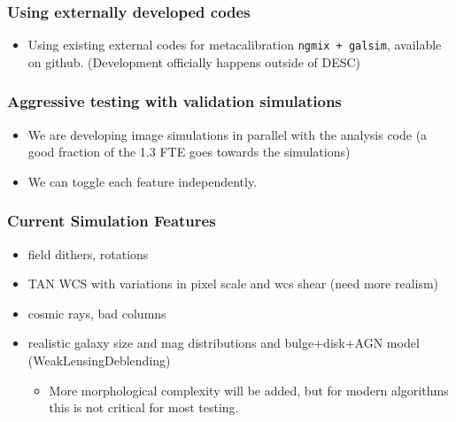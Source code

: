 \documentclass{beamer}
\begin{document}
\frame
{

    \frametitle{Using externally developed codes}

    \begin{itemize}

        \item Using existing external codes for metacalibration \texttt{ngmix + galsim}, available
            on github.  (Development
            officially happens outside of DESC)

    \end{itemize}

}

\frame
{

    \frametitle{Aggressive testing with validation simulations}

    \begin{itemize}

        \item We are developing image simulations in parallel with the analysis
            code (a good fraction of the 1.3 FTE goes towards the simulations)

        \item We can toggle each feature independently.

    \end{itemize}

}

\frame
{

    \frametitle{Current Simulation Features}


    \begin{itemize}

                \item field dithers, rotations

                \item TAN WCS with variations in pixel scale and wcs shear (need more realism)

                \item cosmic rays, bad columns

                \item realistic galaxy size and mag distributions and bulge+disk+AGN model
                  (WeakLensingDeblending)

                  \begin{itemize}

                        \item More morphological complexity will be added, but
                            for modern algorithms this is not critical for most
                            testing.

                  \end{itemize}

    \end{itemize}
}
\end{document}
